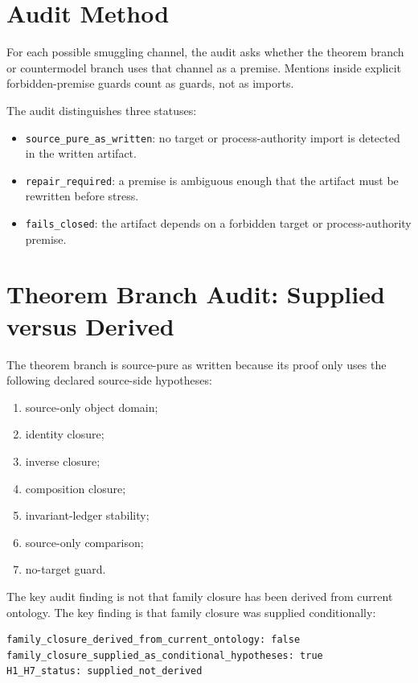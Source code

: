 \documentclass[11pt]{article}
\begin{document}
\section{Audit Method}

For each possible smuggling channel, the audit asks whether the theorem branch
or countermodel branch uses that channel as a premise. Mentions inside
explicit forbidden-premise guards count as guards, not as imports.

The audit distinguishes three statuses:
\begin{itemize}[leftmargin=*]
  \item \texttt{source\_pure\_as\_written}: no target or process-authority
  import is detected in the written artifact.
  \item \texttt{repair\_required}: a premise is ambiguous enough that the
  artifact must be rewritten before stress.
  \item \texttt{fails\_closed}: the artifact depends on a forbidden target or
  process-authority premise.
\end{itemize}

\section{Theorem Branch Audit: Supplied versus Derived}

The theorem branch is source-pure as written because its proof only uses the
following declared source-side hypotheses:
\begin{enumerate}[label=(H\arabic*)]
  \item source-only object domain;
  \item identity closure;
  \item inverse closure;
  \item composition closure;
  \item invariant-ledger stability;
  \item source-only comparison;
  \item no-target guard.
\end{enumerate}

The key audit finding is not that family closure has been derived from current
ontology. The key finding is that family closure was supplied conditionally:

\begin{verbatim}
family_closure_derived_from_current_ontology: false
family_closure_supplied_as_conditional_hypotheses: true
H1_H7_status: supplied_not_derived
\end{verbatim}
\end{document}
